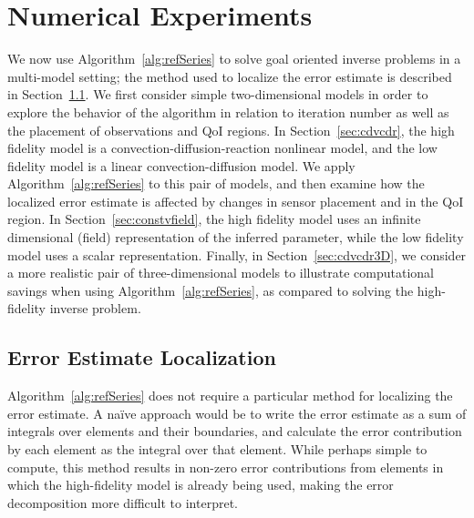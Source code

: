 \section{Numerical Experiments}\label{sect:numexp}
%
We now use Algorithm~\ref{alg:refSeries} to solve goal oriented inverse problems in a multi-model setting; the method used to localize the error estimate is described in Section~\ref{sec:errLocal}. We first consider simple two-dimensional models in order to explore the behavior of the algorithm in relation to iteration number as well as the placement of observations and QoI regions. In Section~\ref{sec:cdvcdr}, the high fidelity model is a convection-diffusion-reaction nonlinear model, and the low fidelity model is a linear convection-diffusion model. We apply Algorithm~\ref{alg:refSeries} to this pair of models, and then examine how the localized error estimate is affected by changes in sensor placement and in the QoI region. In Section~\ref{sec:constvfield}, the high fidelity model uses an infinite dimensional (field) representation of the inferred parameter, while the low fidelity model uses a scalar representation.  Finally, in Section~\ref{sec:cdvcdr3D}, we consider a more realistic pair of three-dimensional models to illustrate computational savings when using Algorithm~\ref{alg:refSeries}, as compared to solving the high-fidelity inverse problem.


\subsection{Error Estimate Localization} \label{sec:errLocal}
Algorithm~\ref{alg:refSeries} does not require a particular method for localizing the error estimate. A na\"{i}ve approach would be to write the error estimate as a sum of integrals over elements and their boundaries, and calculate the error contribution by each element as the integral over that element. While perhaps simple to compute, this method results in non-zero error contributions from elements in which the high-fidelity model is already being used, making the error decomposition more difficult to interpret.

